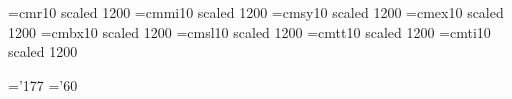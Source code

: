 



\font\twelverm=cmr10 scaled 1200    \font\twelvei=cmmi10 scaled 1200
\font\twelvesy=cmsy10 scaled 1200   \font\twelveex=cmex10 scaled 1200
\font\twelvebf=cmbx10 scaled 1200   \font\twelvesl=cmsl10 scaled 1200
\font\twelvett=cmtt10 scaled 1200   \font\twelveit=cmti10 scaled 1200

\skewchar\twelvei='177   \skewchar\twelvesy='60


\def\twelvepoint{\normalbaselineskip=14.5pt
  \abovedisplayskip 12.4pt plus 3pt minus 9pt
  \belowdisplayskip 12.4pt plus 3pt minus 9pt
  \abovedisplayshortskip 0pt plus 3pt
  \belowdisplayshortskip 7.2pt plus 3pt minus 4pt
  \smallskipamount=3.6pt plus1.2pt minus1.2pt
  \medskipamount=7.2pt plus2.4pt minus2.4pt
  \bigskipamount=14.4pt plus4.8pt minus4.8pt
  \def\rm{\fam0\twelverm}          \def\it{\fam\itfam\twelveit}%
  \def\sl{\fam\slfam\twelvesl}     \def\bf{\fam\bffam\twelvebf}%
  \def\mit{\fam 1}                 \def\cal{\fam 2}%
  \def\tt{\twelvett}
  \textfont0=\twelverm   \scriptfont0=\tenrm   \scriptscriptfont0=\sevenrm
  \textfont1=\twelvei    \scriptfont1=\teni    \scriptscriptfont1=\seveni
  \textfont2=\twelvesy   \scriptfont2=\tensy   \scriptscriptfont2=\sevensy
  \textfont3=\twelveex   \scriptfont3=\twelveex  \scriptscriptfont3=\twelveex
  \textfont\itfam=\twelveit
  \textfont\slfam=\twelvesl
  \textfont\bffam=\twelvebf \scriptfont\bffam=\tenbf
  \scriptscriptfont\bffam=\sevenbf
  \normalbaselines\rm}


